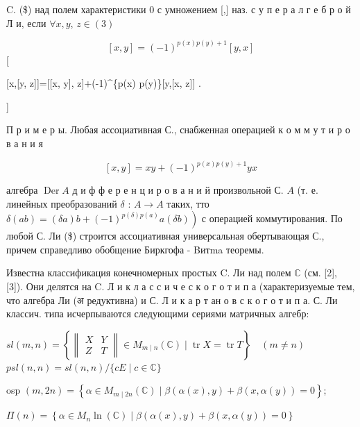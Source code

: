 \documentclass[10pt]{article}
\begin{document}
C. (\$) над полем характеристики 0 с умножением [,] наз. с у п е р а л г е б р о й Л и, если $\forall x, y$, $z \in(3)$



\[

[x, y]=(-1)^{p(x) p(y)+1}[y, x]

\][



[x,[y, z]]=[[x, y], z]+(-1)\^{}\{p(x) p(y)\}[y,[x, z]] .

]



П р и м е р ы. Любая ассоциативная С., снабженная операцией к о м м у т и р о в а н и я



\[

[x, y]=x y+(-1)^{p(x) p(y)+1} y x

\]



алгебра $\operatorname{Der} A$ д и ф ф е р е н ц и р о в а н и й произвольной С. $A$ (т. е. линейных преобразований $\delta$ : $A \rightarrow A$ таких, тто $\left.\delta(a b)=(\delta a) b+(-1)^{p(\delta) p(a)} a(\delta b)\right)$ с операцией коммутирования. По любой С. Ли (\$) строится ассоциативная универсальная обертывающая С., причем справедливо обобщение Биркгофа - Bитma теоремы.



Известна классификация конечномерных простых $\mathrm{C}$. Ли над полем $\mathbb{C}$ (см. [2], [3]). Они делятся на $\mathrm{C}$. Л и к л а с с и ч е с к о г о т и п а (характеризуемые тем, что алгебра Ли (अ редуктивна) и С. Л и к а р т ан о в с к о г о т и п а. С. Ли классич. типа исчерпываются следующими сериями матричных алгебр:



$s l(m, n)=\left\{\left\|\begin{array}{ll}X & Y \\ Z & T\end{array}\right\| \in M_{m \mid n}(\mathbb{C}) \mid \operatorname{tr} X=\operatorname{tr} T\right\} \quad(m \neq n)$ $p s l(n, n)=s l(n, n) /\{c E \mid c \in \mathbb{C}\}$



osp $(m, 2 n)=\left\{\alpha \in M_{m \mid 2 n}(\mathbb{C}) \mid \beta(\alpha(x), y)+\beta(x, \alpha(y))=0\right\}$;



$\Pi(n)=\left\{\alpha \in M_{n} \ln (\mathbb{C}) \mid \beta(\alpha(x), y)+\beta(x, \alpha(y))=0\right\}$
\end{document}
